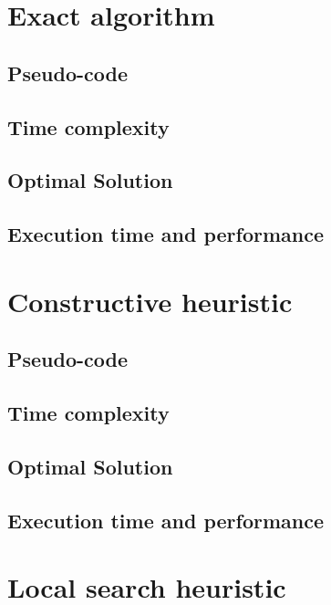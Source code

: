 \documentclass[a4paper, 12pt]{report}
\begin{document}
	\chapter{Exact algorithm}
		\section{Pseudo-code}
		
		\begin{algorithm}
			\SetAlgoLined
		\end{algorithm}
		
		\section{Time complexity}
		\section{Optimal Solution}
		\section{Execution time and performance}
	
	\chapter{Constructive heuristic}
		\section{Pseudo-code}
		\section{Time complexity}
		\section{Optimal Solution}
		\section{Execution time and performance}
	
	\chapter{Local search heuristic}
\end{document}
